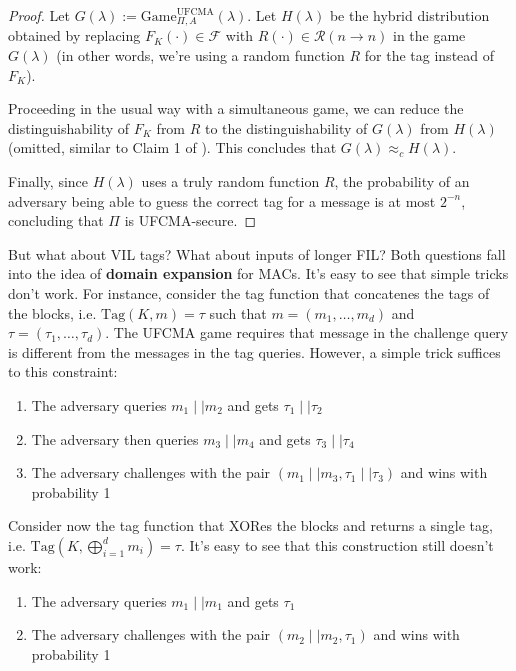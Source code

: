 \documentclass[a4paper, 12pt]{report}
\begin{document}
    \begin{proof}
        Let $G(\lambda) := \mathrm{Game}_{\Pi,A}^{\text{UFCMA}}(\lambda)$. Let $H(\lambda)$ be the hybrid distribution obtained by replacing $F_K(\cdot) \in \mathcal{F}$ with $R(\cdot) \in \mathcal{R}(n \to n)$ in the game $G(\lambda)$ (in other words, we're using a random function $R$ for the tag instead of $F_K$).

        Proceeding in the usual way with a simultaneous game, we can reduce the distinguishability of $F_K$ from $R$ to the distinguishability of $G(\lambda)$ from $H(\lambda)$ (omitted, similar to Claim 1 of ). This concludes that $G(\lambda) \approx_c H(\lambda)$.
        
        Finally, since $H(\lambda)$ uses a truly random function $R$, the probability of an adversary being able to guess the correct tag for a message is at most $2^{-n}$, concluding that $\Pi$ is UFCMA-secure.
    \end{proof}

    But what about VIL tags? What about inputs of longer FIL? Both questions fall into the idea of \textbf{domain expansion} for MACs. It's easy to see that simple tricks don't work. For instance, consider the tag function that concatenes the tags of the blocks, i.e. $\mathrm{Tag}(K,m) = \tau$ such that $m = (m_1, \ldots, m_d)$ and $\tau = (\tau_1, \ldots, \tau_d)$. The UFCMA game requires that message in the challenge query is different from the messages in the tag queries. However, a simple trick suffices to  this constraint:
    \begin{enumerate}
        \item The adversary queries $m_1 \mid\mid m_2$ and gets $\tau_1 \mid\mid \tau_2$
        \item The adversary then queries $m_3 \mid\mid m_4$ and gets $\tau_3 \mid\mid \tau_4$
        \item The adversary challenges with the pair $(m_1 \mid\mid m_3, \tau_1 \mid\mid \tau_3)$ and wins with probability 1
    \end{enumerate}

    Consider now the tag function that XORes the blocks and returns a single tag, i.e. $\mathrm{Tag}(K, \bigoplus_{i = 1}^d m_i) = \tau$. It's easy to see that this construction still doesn't work:
    \begin{enumerate}
        \item The adversary queries $m_1 \mid\mid m_1$ and gets $\tau_1$
        \item The adversary challenges with the pair $(m_2 \mid\mid m_2, \tau_1)$ and wins with probability 1
    \end{enumerate}
\end{document}
